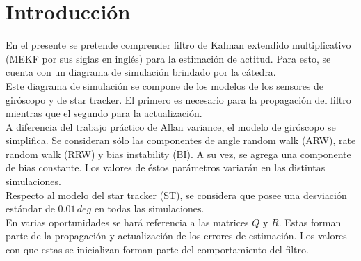 \documentclass[a4paper,11pt,twoside]{IT-CNEA}
\begin{document}
    \tableofcontents       
    \printnomenclature[2cm]

\clearpage  
\newpage
\section{Introducción}
En el presente se pretende comprender filtro de Kalman extendido multiplicativo (MEKF por sus siglas en inglés) para la estimación de actitud. Para esto, se cuenta con un diagrama de simulación brindado por la cátedra. 
\\ Este diagrama de simulación se compone de los modelos de los sensores de giróscopo y de star tracker. El primero es necesario para la propagación del filtro mientras que el segundo para la actualización.
\\ A diferencia del trabajo práctico de Allan variance, el modelo de giróscopo se simplifica. Se consideran sólo las componentes de angle random walk (ARW), rate random walk (RRW) y bias instability (BI). A su vez, se agrega una componente de bias constante. Los valores de éstos parámetros variarán en las distintas simulaciones.
\\ Respecto al modelo del star tracker (ST), se considera que posee una desviación estándar de $0.01\,deg$ en todas las simulaciones. 
\\ En varias oportunidades se hará referencia a las matrices $Q$ y $R$. Estas forman parte de la propagación y actualización de los errores de estimación. Los valores con que estas se inicializan forman parte del comportamiento del filtro. 
\end{document}
